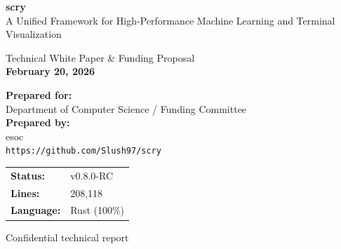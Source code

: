 \documentclass[11pt,a4paper]{article}
\begin{document}
\begin{titlepage}
    \centering
    \vspace*{1cm}
    
    
    \vspace{1cm}
    {\Huge\bfseries\color{googleblue} scry}\\[0.5cm]
    {\huge A Unified Framework for High-Performance Machine Learning and Terminal Visualization}\\[1cm]
    
    \begin{tcolorbox}[colback=lightgray, colframe=lightgray, center, width=0.8\textwidth]
        \centering\large
        Technical White Paper \& Funding Proposal \\
        \textbf{February 20, 2026}
    \end{tcolorbox}
    
    \vspace{1.5cm}
    
    \begin{flushleft}
    \textbf{Prepared for:}\\[0.2cm]
    {\large Department of Computer Science / Funding Committee}\\[1.5cm]
    
    \textbf{Prepared by:}\\[0.2cm]
    {\large esoc}\\[0.3cm]
    \texttt{https://github.com/Slush97/scry}
    \end{flushleft}
    
    \vfill
    
    \begin{minipage}{0.4\textwidth}
        \begin{tabular}{ll}
            \textbf{Status:} & v0.8.0-RC \\
            \textbf{Lines:} & 208,118 \\
            \textbf{Language:} & Rust (100\%) \\
        \end{tabular}
    \end{minipage}
    \hfill
    \begin{minipage}{0.4\textwidth}
        \flushright
        \textcolor{mutedgray}{Confidential technical report}
    \end{minipage}
    
\end{titlepage}
\end{document}
